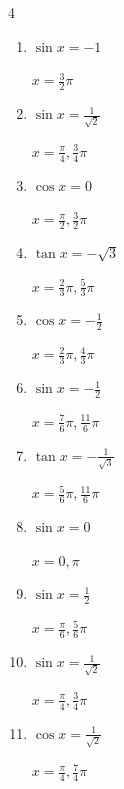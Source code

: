 \begin{multicols}{4}
\begin{enumerate}
        $\displaystyle x = \frac{\pi}{6} , \frac{5}{6}\pi$

\columnbreak %

  \item $\displaystyle \sin{x}  = -1$

        $\displaystyle x = \frac{3}{2}\pi$

  \item $\displaystyle \sin{x}  = \frac{1}{\sqrt{2}}$

        $\displaystyle x = \frac{\pi}{4} , \frac{3}{4}\pi$

  \item $\displaystyle \cos{x}  = 0$

        $\displaystyle x = \frac{\pi}{2} , \frac{3}{2}\pi$

  \item $\displaystyle \tan{x}  = -\sqrt{3}$

        $\displaystyle x = \frac{2}{3}\pi , \frac{5}{3}\pi$

  \item $\displaystyle \cos{x}  = -\frac{1}{2}$

        $\displaystyle x = \frac{2}{3}\pi , \frac{4}{3}\pi$

  \item $\displaystyle \sin{x}  = -\frac{1}{2}$

        $\displaystyle x = \frac{7}{6}\pi , \frac{11}{6}\pi$

  \item $\displaystyle \tan{x}  = -\frac{1}{\sqrt{3}}$

        $\displaystyle x = \frac{5}{6}\pi , \frac{11}{6}\pi$

  \item $\displaystyle \sin{x}  = 0$

        $\displaystyle x = 0 , \pi$

  \item $\displaystyle \sin{x}  = \frac{1}{2}$

        $\displaystyle x = \frac{\pi}{6} , \frac{5}{6}\pi$

  \item $\displaystyle \sin{x}  = \frac{1}{\sqrt{2}}$

        $\displaystyle x = \frac{\pi}{4} , \frac{3}{4}\pi$

  \item $\displaystyle \cos{x}  = \frac{1}{\sqrt{2}}$

        $\displaystyle x = \frac{\pi}{4} , \frac{7}{4}\pi$


\end{enumerate}
\end{multicols}

